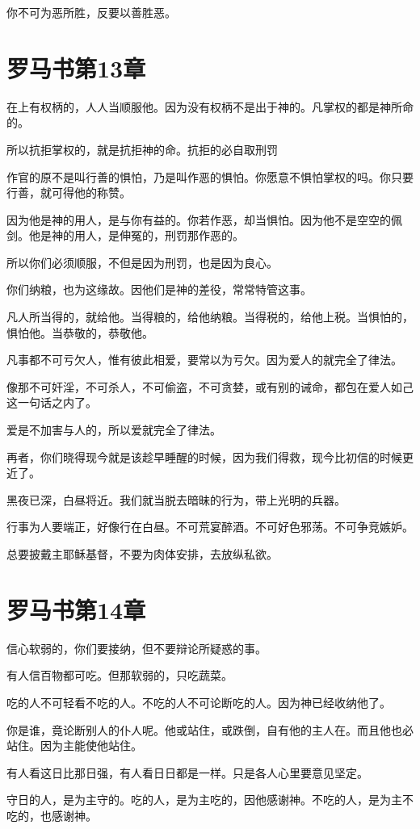 \documentclass[12pt,oneside]{book}
\begin{document}
你不可为恶所胜，反要以善胜恶。

\chapter{罗马书第13章}
在上有权柄的，人人当顺服他。因为没有权柄不是出于神的。凡掌权的都是神所命的。

所以抗拒掌权的，就是抗拒神的命。抗拒的必自取刑罚

作官的原不是叫行善的惧怕，乃是叫作恶的惧怕。你愿意不惧怕掌权的吗。你只要行善，就可得他的称赞。

因为他是神的用人，是与你有益的。你若作恶，却当惧怕。因为他不是空空的佩剑。他是神的用人，是伸冤的，刑罚那作恶的。

所以你们必须顺服，不但是因为刑罚，也是因为良心。

你们纳粮，也为这缘故。因他们是神的差役，常常特管这事。

凡人所当得的，就给他。当得粮的，给他纳粮。当得税的，给他上税。当惧怕的，惧怕他。当恭敬的，恭敬他。

凡事都不可亏欠人，惟有彼此相爱，要常以为亏欠。因为爱人的就完全了律法。

像那不可奸淫，不可杀人，不可偷盗，不可贪婪，或有别的诫命，都包在爱人如己这一句话之内了。

爱是不加害与人的，所以爱就完全了律法。

再者，你们晓得现今就是该趁早睡醒的时候，因为我们得救，现今比初信的时候更近了。

黑夜已深，白昼将近。我们就当脱去暗昧的行为，带上光明的兵器。

行事为人要端正，好像行在白昼。不可荒宴醉酒。不可好色邪荡。不可争竞嫉妒。

总要披戴主耶稣基督，不要为肉体安排，去放纵私欲。

\chapter{罗马书第14章}
信心软弱的，你们要接纳，但不要辩论所疑惑的事。

有人信百物都可吃。但那软弱的，只吃蔬菜。

吃的人不可轻看不吃的人。不吃的人不可论断吃的人。因为神已经收纳他了。

你是谁，竟论断别人的仆人呢。他或站住，或跌倒，自有他的主人在。而且他也必站住。因为主能使他站住。

有人看这日比那日强，有人看日日都是一样。只是各人心里要意见坚定。

守日的人，是为主守的。吃的人，是为主吃的，因他感谢神。不吃的人，是为主不吃的，也感谢神。
\end{document}
